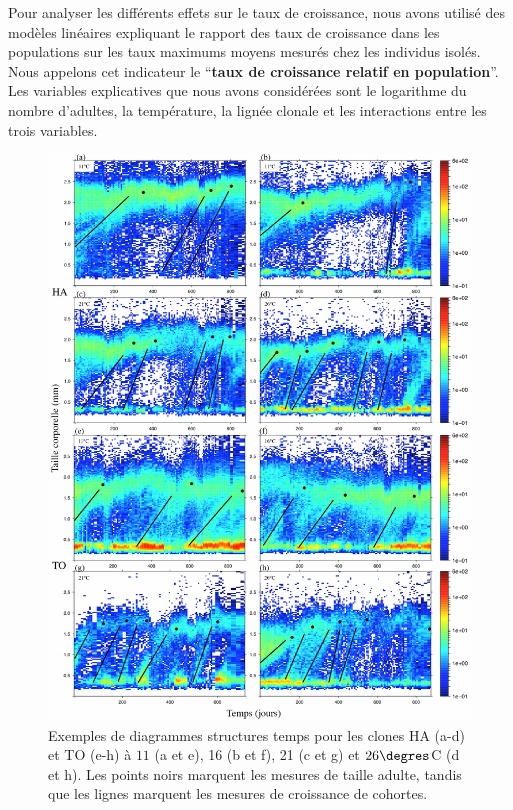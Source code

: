 Pour analyser les différents effets sur le taux de croissance, nous avons
utilisé des modèles linéaires expliquant le rapport des taux de croissance dans
les populations sur les taux maximums moyens mesurés chez les individus isolés.
Nous appelons cet indicateur le ``\textbf{taux de croissance relatif en
population}''. Les variables explicatives que nous avons considérées sont le
logarithme du nombre d'adultes, la température, la lignée clonale et les
interactions entre les trois variables. 

\begin{figure}[H]
\begin{center}
\includegraphics[width=\textwidth]{1_CorpsDeThese/Resumes/Fig/FIP02}
\caption[Exemples de diagrammes
structures temps]{Exemples de diagrammes
structures temps pour les clones HA
(a-d) et TO (e-h) à $11$ (a et e), 16 (b et f), 21 (c et g) et $26\degres$C
(d et h). Les points noirs marquent les mesures de taille
adulte, tandis que les lignes marquent les mesures de
croissance de cohortes.}
\label{fig:FIP2}
\end{center}
\end{figure}

